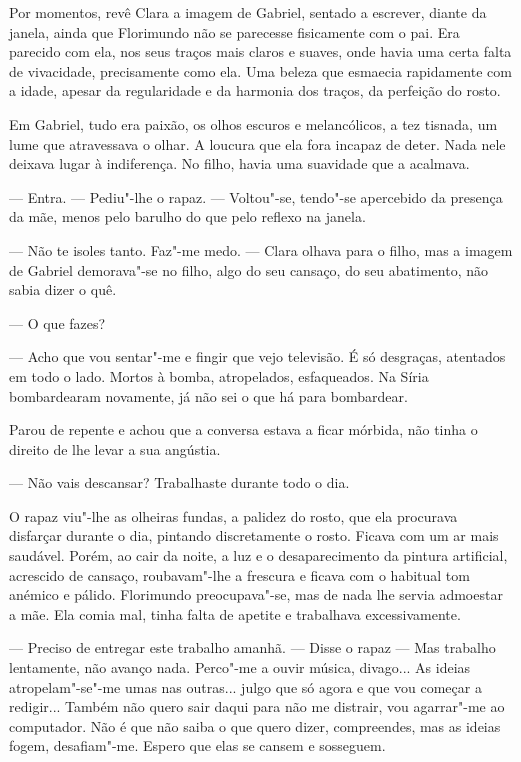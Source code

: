 Por momentos, revê Clara a imagem de Gabriel, sentado a escrever, diante
da janela, ainda que Florimundo não se parecesse fisicamente com o pai.
Era parecido com ela, nos seus traços mais claros e suaves, onde havia
uma certa falta de vivacidade, precisamente como ela. Uma beleza que
esmaecia rapidamente com a idade, apesar da regularidade e da harmonia
dos traços, da perfeição do rosto.

Em Gabriel, tudo era paixão, os olhos escuros e melancólicos, a tez
tisnada, um lume que atravessava o olhar. A loucura que ela fora incapaz
de deter. Nada nele deixava lugar à indiferença. No filho, havia uma
suavidade que a acalmava.

--- Entra. --- Pediu"-lhe o rapaz. --- Voltou"-se, tendo"-se apercebido da
presença da mãe, menos pelo barulho do que pelo reflexo na janela.

--- Não te isoles tanto. Faz"-me medo. --- Clara olhava para o filho, mas a
imagem de Gabriel demorava"-se no filho, algo do seu cansaço, do seu
abatimento, não sabia dizer o quê.

--- O que fazes?

--- Acho que vou sentar"-me e fingir que vejo televisão. É só desgraças,
atentados em todo o lado. Mortos à bomba, atropelados, esfaqueados. Na
Síria bombardearam novamente, já não sei o que há para bombardear.

Parou de repente e achou que a conversa estava a ficar mórbida, não
tinha o direito de lhe levar a sua angústia.

--- Não vais descansar? Trabalhaste durante todo o dia.

O rapaz viu"-lhe as olheiras fundas, a palidez do rosto, que ela
procurava disfarçar durante o dia, pintando discretamente o rosto.
Ficava com um ar mais saudável. Porém, ao cair da noite, a luz e o
desaparecimento da pintura artificial, acrescido de cansaço,
roubavam"-lhe a frescura e ficava com o habitual tom anémico e pálido.
Florimundo preocupava"-se, mas de nada lhe servia admoestar a mãe. Ela
comia mal, tinha falta de apetite e trabalhava excessivamente.

--- Preciso de entregar este trabalho amanhã. ---  Disse o rapaz --- Mas
trabalho lentamente, não avanço nada. Perco"-me a ouvir música, divago...
As ideias atropelam"-se"-me umas nas outras... julgo que só agora e que
vou começar a redigir... Também não quero sair daqui para não me
distrair, vou agarrar"-me ao computador. Não é que não saiba o que quero
dizer, compreendes, mas as ideias fogem, desafiam"-me. Espero que elas se
cansem e sosseguem.

